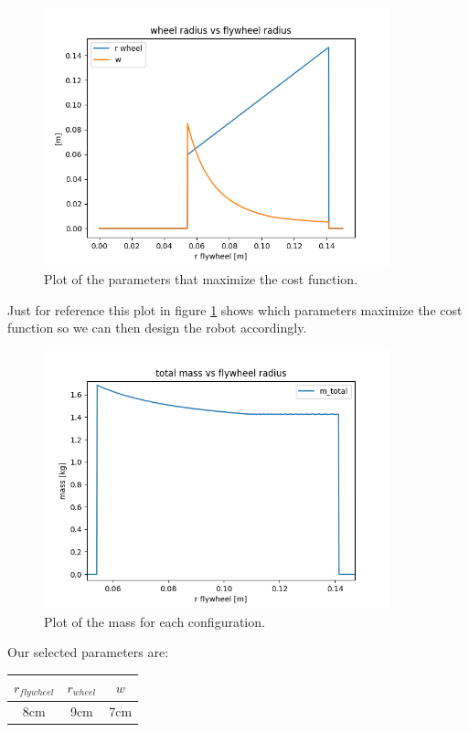 \begin{figure}[H]
	\centering
	\includegraphics[width=10cm]{img/optimization/parameters.png}
	\caption{Plot of the parameters that maximize the cost function.}
	\label{fig:Parameters plot}
\end{figure}
Just for reference this plot in figure \ref{fig:Parameters plot} shows which parameters maximize the cost function so we can then design the robot accordingly.

\begin{figure}[H]
	\centering
	\includegraphics[width=10cm]{img/optimization/mass.png}
	\caption{Plot of the mass for each configuration.}
	\label{fig:Mass plot}
\end{figure}

Our selected parameters are:
\begin{center}
	\begin{tabular}{ |c|c|c| } 
	 \hline
	 $r_{flywheel}$ & $r_{wheel}$ & $w$ \\
	 \hline 
	 8cm & 9cm & 7cm \\ 
	 \hline
	\end{tabular}
	\end{center}

